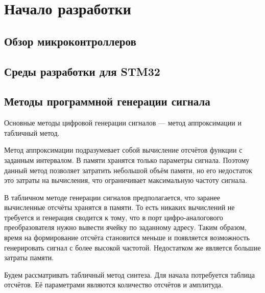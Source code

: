 \chapter{Начало разработки}

\section{Обзор микроконтроллеров}



\section{Среды разработки для STM32}




\section{Методы программной генерации сигнала}
	Основные методы цифровой генерации сигналов --- метод аппроксимации и табличный метод.
	
	Метод аппроксимации подразумевает собой вычисление отсчётов функции с заданным интервалом. В памяти хранятся только параметры сигнала. Поэтому данный метод позволяет затратить небольшой объём памяти, но его недостаток это затраты на вычисления, что ограничивает максимальную частоту сигнала.
	
	В табличном методе генерации сигналов предполагается, что заранее вычисленные отсчёты хранятся в памяти. То есть никаких вычислений не требуется и генерация сводится к тому, что в порт цифро-аналогового преобразователя нужно вывести ячейку по заданному адресу. Таким образом, время на формирование отсчёта становится меньше и появляется возможность генерировать сигнал с более высокой частотой. Недостатком же является большие затраты памяти.
	
	Будем рассматривать табличный метод синтеза. Для начала потребуется таблица отсчётов. Её параметрами являются количество отсчётов и амплитуда.